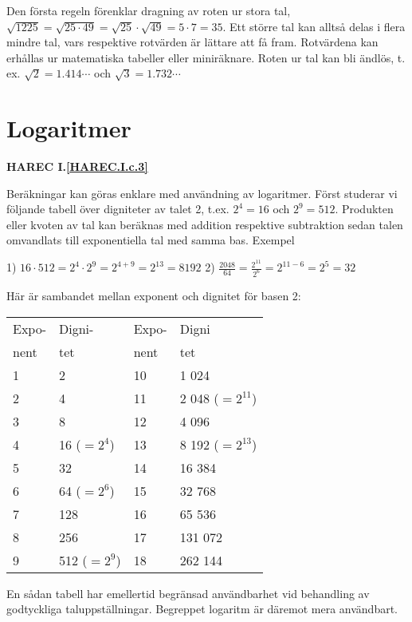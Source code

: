 Den första regeln förenklar dragning av roten ur stora tal,
\(\sqrt{1225} = \sqrt{25 \cdot 49} = \sqrt{25} \cdot \sqrt{49} = 5 \cdot 7 = 35\).
Ett större tal kan alltså delas i flera mindre tal, vars respektive rotvärden är
lättare att få fram. Rotvärdena kan erhållas ur matematiska tabeller eller
miniräknare.
Roten ur tal kan bli ändlös, t. ex.
\(\sqrt{2} = 1.414\cdots\) och \(\sqrt{3} = 1.732\cdots\)

\section{Logaritmer}
\label{logaritmer}
\textbf{HAREC I.\ref{HAREC.I.c.3}\label{myHAREC.I.c.3}}

Beräkningar kan göras enklare med användning av logaritmer.
Först studerar vi följande tabell över digniteter av talet 2,
t.ex. \(2^4 = 16\) och \(2^9 = 512\).
Produkten eller kvoten av tal kan beräknas med addition respektive subtraktion
sedan talen omvandlats till exponentiella tal med samma bas.
Exempel

1) \(16 \cdot 512 = 2^4 \cdot 2^9 =2^{4+9} = 2^{13} = 8192\)
2) \(\frac{2048}{64} = \frac{2^{11}}{2^6} =2^{11-6} =2^5 = 32\)

Här är sambandet mellan exponent och dignitet för basen 2:

\begin{tabular}{ll|ll}
Expo- & Digni-       & Expo- & Digni            \\
nent  & tet          & nent  & tet              \\ \hline
1     & 2            & 10    & 1 024            \\
2     & 4            & 11    & 2 048 (\(=2^{11}\)) \\
3     & 8            & 12    & 4 096            \\
4     & 16 (\(=2^4\))  & 13    & 8 192 (\(=2^{13}\)) \\
5     & 32           & 14    & 16 384           \\
6     & 64 (\(=2^6\))  & 15    & 32 768           \\
7     & 128          & 16    & 65 536           \\
8     & 256          & 17    & 131 072          \\
9     & 512 (\(=2^9\)) & 18    & 262 144
\end{tabular}

En sådan tabell har emellertid begränsad
användbarhet vid behandling av godtyckliga
taluppställningar. Begreppet logaritm är däremot mera användbart.

